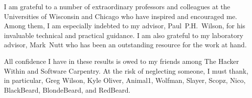 I am grateful to a number of extraordinary professors and colleagues at the 
Universities of Wisconsin and Chicago who have inspired and encouraged me. Among  
them, I am especially indebted to my advisor, Paul~P.H.~Wilson, for his invaluable 
technical and practical guidance. I am also grateful to my laboratory advisor, 
Mark~Nutt who has been an outstanding resource for the work at hand.

All confidence I have in these results is owed to my friends among The Hacker 
Within and Software Carpentry. At the risk of neglecting someone, I must thank, 
in particular, Greg Wilson, Kyle Oliver, Animal1, Wolfman, Slayer, Scopz, Nico,  
BlackBeard, BlondeBeard, and RedBeard.

